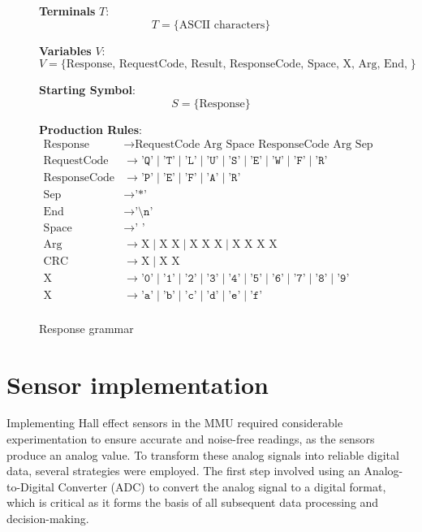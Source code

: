 \begin{figure}[ht]
\centering
\caption{Response grammar}
\label{fig:response-grammar}

\textbf{Terminals} \( T \): \[ T = \{\text{ASCII characters}\} \]

\textbf{Variables} \( V \): \[ V = \{\text{Response, RequestCode, Result, ResponseCode, Space, X, Arg, End, Sep, CRC}\} \]

\textbf{Starting Symbol}: \[ S = \{\text{Response}\} \]

\textbf{Production Rules}:
\begin{align*}
\text{Response} & \to \text{RequestCode Arg Space ResponseCode Arg Sep CRC End} \\
\text{RequestCode} & \to \texttt{'Q'} \mid \texttt{'T'} \mid \texttt{'L'} \mid \texttt{'U'} \mid \texttt{'S'} \mid \texttt{'E'} \mid \texttt{'W'} \mid \texttt{'F'} \mid \texttt{'R'} \\
\text{ResponseCode} & \to \texttt{'P'} \mid \texttt{'E'} \mid \texttt{'F'} \mid \texttt{'A'} \mid \texttt{'R'} \\
\text{Sep} & \to \texttt{'*'} \\
\text{End} & \to \texttt{'\textbackslash n'} \\
\text{Space} & \to \texttt{' '} \\
\text{Arg} & \to \text{X} \mid \text{X X} \mid \text{X X X} \mid \text{X X X X} \\
\text{CRC} & \to \text{X} \mid \text{X X} \\
\text{X} & \to \texttt{'0'} \mid \texttt{'1'} \mid \texttt{'2'} \mid \texttt{'3'} \mid \texttt{'4'} \mid \texttt{'5'} \mid \texttt{'6'} \mid \texttt{'7'} \mid \texttt{'8'} \mid \texttt{'9'} \\
\text{X} & \to \texttt{'a'} \mid \texttt{'b'} \mid \texttt{'c'} \mid \texttt{'d'} \mid \texttt{'e'} \mid \texttt{'f'} \\
\end{align*}
\end{figure}


\section{Sensor implementation}

Implementing Hall effect sensors in the MMU required considerable experimentation to ensure accurate and noise-free readings, as the sensors produce an analog value. To transform these analog signals into reliable digital data, several strategies were employed. The first step involved using an Analog-to-Digital Converter (ADC) to convert the analog signal to a digital format, which is critical as it forms the basis of all subsequent data processing and decision-making.

